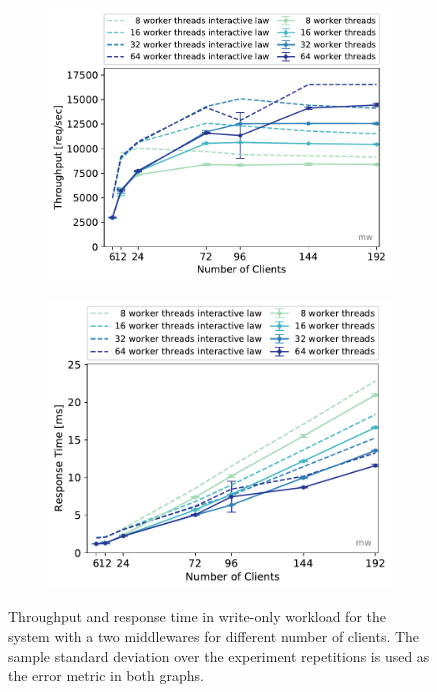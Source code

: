 \documentclass[11pt,a4paper]{article}
\begin{document}
\begin{figure}
	\begin{subfigure}[b]{.49\linewidth}
		\centering
		\includegraphics[width=\linewidth]{data/exp32_wo_tp_nc_w.pdf}
	\end{subfigure}\hfill
	\begin{subfigure}[b]{.49\linewidth}
		\centering
		\includegraphics[width=\linewidth]{data/exp32_wo_rt_nc_w.pdf}
	\end{subfigure}%
	\caption{Throughput and response time in write-only workload for the system with a two middlewares for different number of clients. The sample standard deviation over the experiment repetitions is used as the error metric in both graphs.}\label{exp32_wo_tp_nc}
\end{figure}
\end{document}
